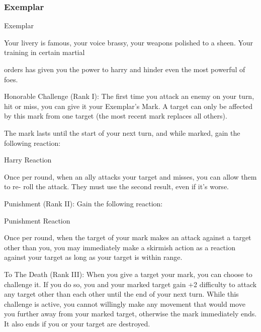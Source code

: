 \subsubsection{Exemplar}

                                                  Exemplar

Your livery is famous, your voice brassy, your weapons polished to a sheen. Your training in certain martial

orders has given you the power to harry and hinder even the most powerful of foes.

Honorable Challenge (Rank I): The first time you attack an enemy on your turn, hit or miss, you
can give it your Exemplar’s Mark. A target can only be affected by this mark from one target (the
most recent mark replaces all others).

The mark lasts until the start of your next turn, and while marked, gain the following reaction:

         Harry
         Reaction

         Once per round, when an ally attacks your target and misses, you can allow them to re-
         roll the attack. They must use the second result, even if it’s worse.

Punishment (Rank II): Gain the following reaction:

	        Punishment
	        Reaction

         Once per round, when the target of your mark makes an attack against a target other than
         you, you may immediately make a skirmish action as a reaction against your target as
         long as your target is within range.

To The Death (Rank III): When you give a target your mark, you can choose to challenge it. If
you do so, you and your marked target gain +2 difficulty to attack any target other than each
other until the end of your next turn. While this challenge is active, you cannot willingly make any
movement that would move you further away from your marked target, otherwise the mark
immediately ends. It also ends if you or your target are destroyed.